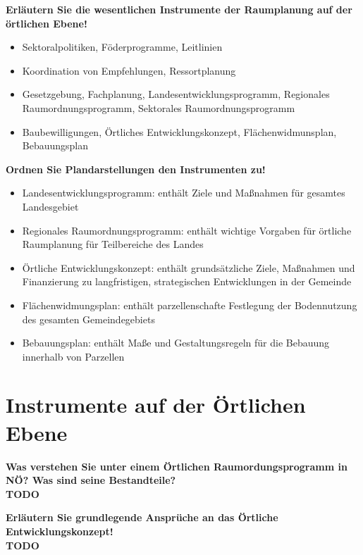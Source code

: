 \documentclass[]{article}
\newenvironment{question}{\vspace{8mm}\noindent\bfseries}{\\}
\begin{document}
\begin{question}
	Erläutern Sie die wesentlichen Instrumente der Raumplanung auf der örtlichen Ebene!
\end{question}
\begin{itemize}
	\item Sektoralpolitiken, Föderprogramme, Leitlinien
	\item Koordination von Empfehlungen, Ressortplanung
	\item Gesetzgebung, Fachplanung, Landesentwicklungsprogramm, Regionales Raumordnungsprogramm, Sektorales Raumordnungsprogramm
	\item Baubewilligungen, Örtliches Entwicklungskonzept, Flächenwidmunsplan, Bebauungsplan
\end{itemize}


\begin{question}
	Ordnen Sie Plandarstellungen den Instrumenten zu!
\end{question}
\begin{itemize}
	\item Landesentwicklungsprogramm: enthält Ziele und Maßnahmen für gesamtes Landesgebiet
	\item Regionales Raumordnungsprogramm: enthält wichtige Vorgaben für örtliche Raumplanung für Teilbereiche des Landes
	\item Örtliche Entwicklungskonzept: enthält grundsätzliche Ziele, Maßnahmen und Finanzierung zu langfristigen, strategischen Entwicklungen in der Gemeinde
	\item Flächenwidmungsplan: enthält parzellenschafte Festlegung der Bodennutzung des gesamten Gemeindegebiets
	\item Bebauungsplan: enthält Maße und Gestaltungsregeln für die Bebauung innerhalb von Parzellen
\end{itemize}


\section{Instrumente auf der Örtlichen Ebene}
\begin{question}
	Was verstehen Sie unter einem Örtlichen Raumordungsprogramm in NÖ? Was sind seine Bestandteile?
\end{question}
TODO

\begin{question}
	Erläutern Sie grundlegende Ansprüche an das Örtliche Entwicklungskonzept!
\end{question}
TODO
\end{document}
